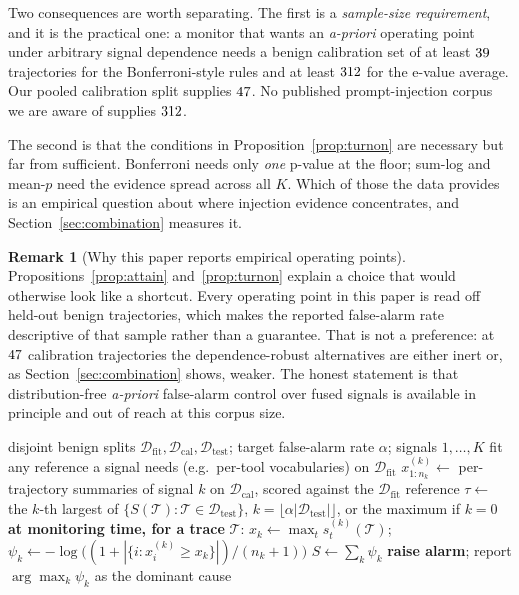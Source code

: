 \documentclass[preprint,12pt,authoryear]{elsarticle}
\theoremstyle{definition}
\newtheorem{remark}{Remark}
\newcommand{\Tcal}{\mathcal{T}}
\newcommand{\Dcal}{\mathcal{D}}
\begin{document}
Two consequences are worth separating. The first is a \emph{sample-size
requirement}, and it is the practical one: a monitor that wants an
\emph{a-priori} operating point under arbitrary signal dependence needs a benign
calibration set of at least $39$ trajectories for the Bonferroni-style
rules and at least $312$ for the e-value average. Our pooled calibration
split supplies $47$. No published prompt-injection corpus we are aware of
supplies $312$.

The second is that the conditions in Proposition~\ref{prop:turnon} are necessary
but far from sufficient. Bonferroni needs only \emph{one} p-value at the floor;
sum-log and mean-$p$ need the evidence spread across all $K$. Which of those the
data provides is an empirical question about where injection evidence
concentrates, and Section~\ref{sec:combination} measures it.

\begin{remark}[Why this paper reports empirical operating points]
\label{rem:whyempirical}
Propositions~\ref{prop:attain} and~\ref{prop:turnon} explain a choice that would
otherwise look like a shortcut. Every operating point in this paper is read off
held-out benign trajectories, which makes the reported false-alarm rate
descriptive of that sample rather than a guarantee. That is not a preference: at
$47$ calibration trajectories the dependence-robust alternatives are
either inert or, as Section~\ref{sec:combination} shows, weaker. The honest
statement is that distribution-free \emph{a-priori} false-alarm control over fused
signals is available in principle and out of reach at this corpus size.
\end{remark}

\begin{algorithm}[t]
\caption{SENTRY-Fuse}\label{alg:fuse}
\begin{algorithmic}[1]
\Require disjoint benign splits $\Dcal_{\mathrm{fit}}, \Dcal_{\mathrm{cal}}, \Dcal_{\mathrm{test}}$; target false-alarm rate $\alpha$; signals $1,\dots,K$
\State fit any reference a signal needs (e.g.\ per-tool vocabularies) on $\Dcal_{\mathrm{fit}}$
  \State $x^{(k)}_{1:n_k} \gets$ per-trajectory summaries of signal $k$ on $\Dcal_{\mathrm{cal}}$, scored against the $\Dcal_{\mathrm{fit}}$ reference
\EndFor
\State $\tau \gets$ the $k$-th largest of $\{S(\Tcal) : \Tcal \in \Dcal_{\mathrm{test}}\}$, $k = \lfloor \alpha |\Dcal_{\mathrm{test}}| \rfloor$, or the maximum if $k=0$ 
\Statex \textbf{at monitoring time, for a trace} $\Tcal$:
  \State $x_k \gets \max_t s^{(k)}_t(\Tcal)$;\quad
         $\psi_k \gets -\log\big((1 + |\{i : x^{(k)}_i \ge x_k\}|)/(n_k+1)\big)$
\EndFor
\State $S \gets \sum_k \psi_k$
 \textbf{raise alarm}; report $\arg\max_k \psi_k$ as the dominant cause
\EndIf
\end{algorithmic}
\end{algorithm}
\end{document}
